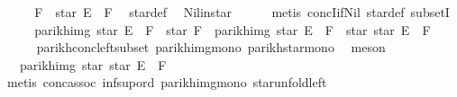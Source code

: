 \begin{isabellebody}
%
\isadelimproof
%
\endisadelimproof
%
\isatagproof
{}\isamarkupfalse%
\ {\isacharminus}{\kern0pt}\isanewline
\ \ \isamarkupfalse%
\ {\isachardoublequoteopen}F\ {\isasymsubseteq}\ star\ E\ {\isacharat}{\kern0pt}{\isacharat}{\kern0pt}\ F{\isachardoublequoteclose}\ \isamarkupfalse%
\ star{\isacharunderscore}{\kern0pt}def\ \isamarkupfalse%
\ Nil{\isacharunderscore}{\kern0pt}in{\isacharunderscore}{\kern0pt}star\isanewline
\ \ \ \ \isamarkupfalse%
\ {\isacharparenleft}{\kern0pt}metis\ concI{\isacharunderscore}{\kern0pt}if{\isacharunderscore}{\kern0pt}Nil{}\ star{\isacharunderscore}{\kern0pt}def\ subsetI{\isacharparenright}{\kern0pt}\isanewline
\ \ \isamarkupfalse%
\ \isamarkupfalse%
\ {\isachardoublequoteopen}parikh{\isacharunderscore}{\kern0pt}img\ {\isacharparenleft}{\kern0pt}star\ E\ {\isacharat}{\kern0pt}{\isacharat}{\kern0pt}\ F\ {\isacharat}{\kern0pt}{\isacharat}{\kern0pt}\ star\ F{\isacharparenright}{\kern0pt}\ {\isasymsubseteq}\ parikh{\isacharunderscore}{\kern0pt}img\ {\isacharparenleft}{\kern0pt}star\ E\ {\isacharat}{\kern0pt}{\isacharat}{\kern0pt}\ F\ {\isacharat}{\kern0pt}{\isacharat}{\kern0pt}\ star\ {\isacharparenleft}{\kern0pt}star\ E\ {\isacharat}{\kern0pt}{\isacharat}{\kern0pt}\ F{\isacharparenright}{\kern0pt}{\isacharparenright}{\kern0pt}{\isachardoublequoteclose}\isanewline
\ \ \ \ \isamarkupfalse%
\ parikh{\isacharunderscore}{\kern0pt}conc{\isacharunderscore}{\kern0pt}left{\isacharunderscore}{\kern0pt}subset\ parikh{\isacharunderscore}{\kern0pt}img{\isacharunderscore}{\kern0pt}mono\ parikh{\isacharunderscore}{\kern0pt}star{\isacharunderscore}{\kern0pt}mono\ \isamarkupfalse%
\ meson\isanewline
\ \ \isamarkupfalse%
\ \isamarkupfalse%
\ {\isachardoublequoteopen}{\isasymdots}\ {\isasymsubseteq}\ parikh{\isacharunderscore}{\kern0pt}img\ {\isacharparenleft}{\kern0pt}star\ {\isacharparenleft}{\kern0pt}star\ E\ {\isacharat}{\kern0pt}{\isacharat}{\kern0pt}\ F{\isacharparenright}{\kern0pt}{\isacharparenright}{\kern0pt}{\isachardoublequoteclose}\isanewline
\ \ \ \ \isamarkupfalse%
\ {\isacharparenleft}{\kern0pt}metis\ conc{\isacharunderscore}{\kern0pt}assoc\ inf{\isacharunderscore}{\kern0pt}sup{\isacharunderscore}{\kern0pt}ord{\isacharparenleft}{\kern0pt}{}{\isacharparenright}{\kern0pt}\ parikh{\isacharunderscore}{\kern0pt}img{\isacharunderscore}{\kern0pt}mono\ star{\isacharunderscore}{\kern0pt}unfold{\isacharunderscore}{\kern0pt}left{\isacharparenright}{\kern0pt}\isanewline

\end{isabellebody}
